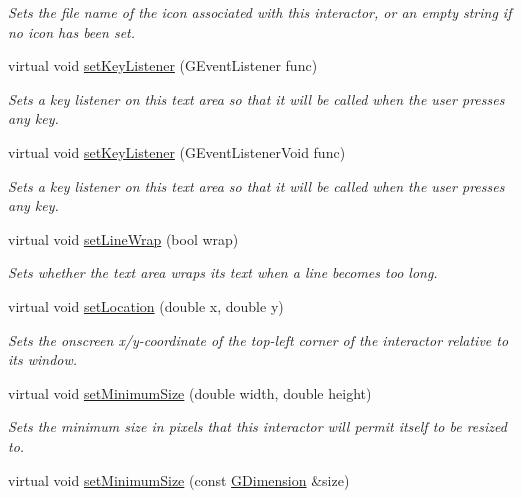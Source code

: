 \begin{DoxyCompactItemize}
\begin{DoxyCompactList}\small\item\em Sets the file name of the icon associated with this interactor, or an empty string if no icon has been set. \end{DoxyCompactList}\item 
virtual void \mbox{\hyperlink{classGTextArea_aeb8324d3287fa1fbe093f4d6230cf0a6}{set\+Key\+Listener}} (G\+Event\+Listener func)
\begin{DoxyCompactList}\small\item\em Sets a key listener on this text area so that it will be called when the user presses any key. \end{DoxyCompactList}\item 
virtual void \mbox{\hyperlink{classGTextArea_ae48ecea73606c7bd9423e1c7cc589cc9}{set\+Key\+Listener}} (G\+Event\+Listener\+Void func)
\begin{DoxyCompactList}\small\item\em Sets a key listener on this text area so that it will be called when the user presses any key. \end{DoxyCompactList}\item 
virtual void \mbox{\hyperlink{classGTextArea_aaaafb06fec060b28b70ec3b7379657b4}{set\+Line\+Wrap}} (bool wrap)
\begin{DoxyCompactList}\small\item\em Sets whether the text area wraps its text when a line becomes too long. \end{DoxyCompactList}\item 
virtual void \mbox{\hyperlink{classGInteractor_a04594e8ba9b98513a64f1da00dcae18c}{set\+Location}} (double x, double y)
\begin{DoxyCompactList}\small\item\em Sets the onscreen x/y-\/coordinate of the top-\/left corner of the interactor relative to its window. \end{DoxyCompactList}\item 
virtual void \mbox{\hyperlink{classGInteractor_a0cf428e207b7f22cc08138a90b1b87b2}{set\+Minimum\+Size}} (double width, double height)
\begin{DoxyCompactList}\small\item\em Sets the minimum size in pixels that this interactor will permit itself to be resized to. \end{DoxyCompactList}\item 
virtual void \mbox{\hyperlink{classGInteractor_a3b1046117ac6cb7abe467e00ba8a81f4}{set\+Minimum\+Size}} (const \mbox{\hyperlink{classGDimension}{G\+Dimension}} \&size)

\end{DoxyCompactItemize}
